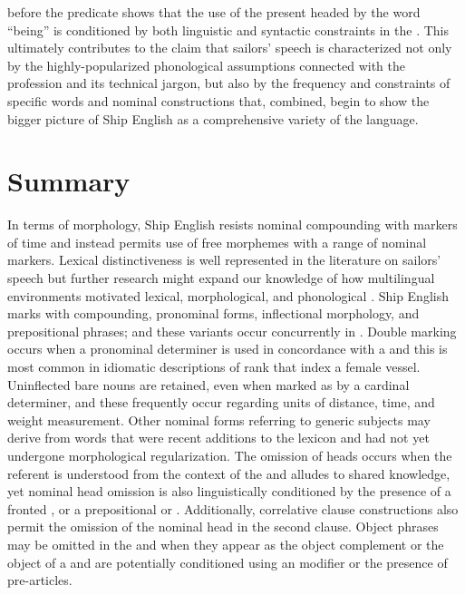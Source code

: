 before the predicate shows that the use of the present  headed by the word “being” is conditioned by both linguistic and syntactic constraints in the . This ultimately contributes to the claim that sailors’ speech is characterized not only by the highly-popularized phonological assumptions connected with the profession and its technical jargon, but also by the frequency and constraints of specific words and nominal constructions that, combined, begin to show the bigger picture of Ship English as a comprehensive variety of the language.  

\section{{Summary} }\label{sec:5.6}

In terms of morphology, Ship English resists nominal compounding with markers of time and instead permits use of free morphemes with a range of nominal markers. Lexical distinctiveness is well represented in the literature on sailors’ speech but further research might expand our knowledge of how multilingual environments motivated lexical, morphological, and phonological . Ship English marks  with  compounding,  pronominal forms, inflectional morphology, and prepositional phrases; and these variants occur concurrently in . Double  marking occurs when a pronominal  determiner is used in concordance with a  and this is most common in idiomatic descriptions of rank that index a female vessel. Uninflected bare nouns are retained, even when marked as  by a cardinal determiner, and these frequently occur regarding units of distance, time, and weight measurement. Other  nominal forms referring to generic subjects may derive from words that were recent additions to the lexicon and had not yet undergone morphological regularization. The omission of  heads occurs when the referent is understood from the context of the  and alludes to shared knowledge, yet nominal head omission is also linguistically conditioned by the presence of a fronted , or a prepositional or . Additionally, correlative clause constructions also permit the omission of the nominal head in the second clause. Object  phrases may be omitted in the  and when they appear as the object complement or the object of a  and are potentially conditioned using an  modifier or the presence of pre-articles.


